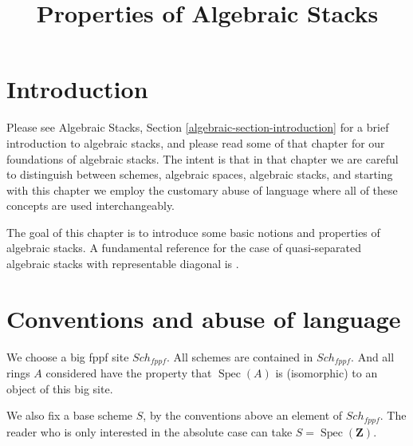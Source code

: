 \documentclass{stacks-project}
\theoremstyle{plain}
\theoremstyle{definition}
\theoremstyle{remark}
\numberwithin{equation}{subsection}
\def\Spec{\mathop{\mathrm{Spec}}}
\def\Sch{\mathit{Sch}}
\begin{document}
\title{Properties of Algebraic Stacks}


\maketitle

\label{section-phantom}

\tableofcontents

\section{Introduction}
\label{section-introduction}

\noindent
Please see
Algebraic Stacks, Section \ref{algebraic-section-introduction}
for a brief introduction to algebraic stacks, and please read
some of that chapter for our foundations of algebraic stacks.
The intent is that in that chapter we are careful to distinguish
between schemes, algebraic spaces, algebraic stacks, and starting
with this chapter we employ the customary abuse of language where
all of these concepts are used interchangeably.

\medskip\noindent
The goal of this chapter is to introduce some basic notions and
properties of algebraic stacks. A fundamental
reference for the case of quasi-separated algebraic stacks with representable
diagonal is \cite{LM-B}.



\section{Conventions and abuse of language}
\label{section-conventions}

\noindent
We choose a big fppf site $\Sch_{fppf}$.
All schemes are contained in $\Sch_{fppf}$.
And all rings $A$ considered have the property that
$\Spec(A)$ is (isomorphic) to an object of this big site.

\medskip\noindent
We also fix a base scheme $S$, by the conventions above an element
of $\Sch_{fppf}$. The reader who is only interested
in the absolute case can take $S = \Spec(\mathbf{Z})$.
\end{document}

